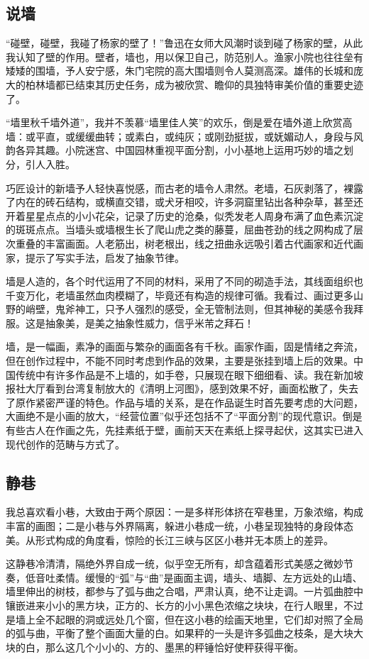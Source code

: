 \documentclass{article}
\begin{document}
\subsection{说墙}
“碰壁，碰壁，我碰了杨家的壁了！”鲁迅在女师大风潮时谈到碰了杨家的壁，从此我认知了壁的作用。壁者，墙也，用以保卫自己，防范别人。渔家小院也往往垒有矮矮的围墙，予人安宁感，朱门宅院的高大围墙则令人莫测高深。雄伟的长城和庞大的柏林墙都已结束其历史任务，成为被欣赏、瞻仰的具独特审美价值的重要史迹了。

“墙里秋千墙外道”，我并不羡慕“墙里佳人笑”的欢乐，倒是爱在墙外道上欣赏高墙：或平直，或缓缓曲转；或素白，或纯灰；或刚劲挺拔，或妩媚动人，身段与风韵各异其趣。小院迷宫、中国园林重视平面分割，小小基地上运用巧妙的墙之划分，引人入胜。

巧匠设计的新墙予人轻快喜悦感，而古老的墙令人肃然。老墙，石灰剥落了，裸露了内在的砖石结构，或横直交错，或犬牙相咬，许多洞窟里钻出各种杂草，甚至还开着星星点点的小小花朵，记录了历史的沧桑，似秃发老人周身布满了血色素沉淀的斑斑点点。当墙头或墙根生长了爬山虎之类的藤蔓，屈曲苍劲的线之网构成了层次重叠的丰富画面。人老筋出，树老根出，线之扭曲永远吸引着古代画家和近代画家，提示了写实手法，启发了抽象节律。

墙是人造的，各个时代运用了不同的材料，采用了不同的砌造手法，其线面组织也千变万化，老墙虽然血肉模糊了，毕竟还有构造的规律可循。我看过、画过更多山野的峭壁，鬼斧神工，只予人强烈的感受，全无管制法则，但其神秘的美感令我拜服。这是抽象美，是美之抽象性威力，信乎米芾之拜石！

墙，是一幅画，素净的画面与繁杂的画面各有千秋。画家作画，固是情绪之奔流，但在创作过程中，不能不同时考虑到作品的效果，主要是张挂到墙上后的效果。中国传统中有许多作品是不上墙的，如手卷，只展现在眼下细细看、读。我在新加坡报社大厅看到台湾复制放大的《清明上河图》，感到效果不好，画面松散了，失去了原作紧密严谨的特色。作品与墙的关系，是在作品诞生时首先要考虑的大问题，大画绝不是小画的放大，“经营位置”似乎还包括不了“平面分割”的现代意识。倒是有些古人在作画之先，先挂素纸于壁，画前天天在素纸上探寻起伏，这其实已进入现代创作的范畴与方式了。
\subsection{静巷}
我总喜欢看小巷，大致由于两个原因：一是多样形体挤在窄巷里，万象浓缩，构成丰富的画图；二是小巷与外界隔离，躲进小巷成一统，小巷呈现独特的身段体态美。从形式构成的角度看，惊险的长江三峡与区区小巷并无本质上的差异。

这静巷冷清清，隔绝外界自成一统，似乎空无所有，却含蕴着形式美感之微妙节奏，低音吐柔情。缓慢的“弧”与“曲”是画面主调，墙头、墙脚、左方远处的山墙、墙里伸出的树枝，都参与了弧与曲之合唱，严肃认真，绝不让走调。一片弧曲腔中镶嵌进来小小的黑方块，正方的、长方的小小黑色浓缩之块块，在行人眼里，不过是墙上全不起眼的洞或远处几个窗，但在这小巷的绘画天地里，它们却对照了全局的弧与曲，平衡了整个画面大量的白。如果秤的一头是许多弧曲之枝条，是大块大块的白，那么这几个小小的、方的、墨黑的秤锤恰好使秤获得平衡。
\end{document}
